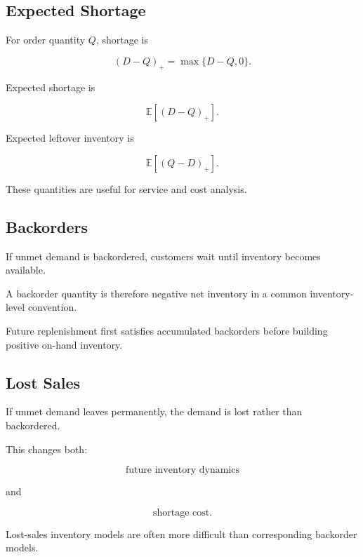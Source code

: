 \subsection{Expected Shortage}
\label{subsec:expected-shortage}

For order quantity \(Q\), shortage is

\[
\boxed{
(D-Q)_+
=
\max
\{
D-Q,0
\}.
}
\]

Expected shortage is

\[
\boxed{
\mathbb{E}
[
(D-Q)_+
].
}
\]

Expected leftover inventory is

\[
\boxed{
\mathbb{E}
[
(Q-D)_+
].
}
\]

These quantities are useful for service and cost analysis.

\subsection{Backorders}
\label{subsec:inventory-backorders}

If unmet demand is backordered, customers wait until inventory becomes
available.

A backorder quantity is therefore negative net inventory in a common
inventory-level convention.

Future replenishment first satisfies accumulated backorders before
building positive on-hand inventory.

\subsection{Lost Sales}
\label{subsec:lost-sales}

If unmet demand leaves permanently, the demand is lost rather than
backordered.

This changes both:

\[
\boxed{
\text{future inventory dynamics}
}
\]

and

\[
\boxed{
\text{shortage cost}.
}
\]

Lost-sales inventory models are often more difficult than corresponding
backorder models.

